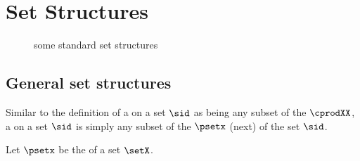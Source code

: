 

\chapter{Set Structures}

\begin{figure}
\centering

\caption{some standard set structures\label{fig:setstructures}}
\end{figure}

\section{General set structures}
Similar to the definition of a  on a set $\sid$
as being any subset of the  $\cprodXX$,
a  on a set $\sid$ is simply any subset of the
 $\psetx$ (next) of the set $\sid$.
\begin{definition}
\label{def:pset}
\label{def:powerset}
\end{definition}

\begin{definition}
\label{def:ss}
\label{def:paving}
Let $\psetx$ be the   of a set $\setX$.
\end{definition}

